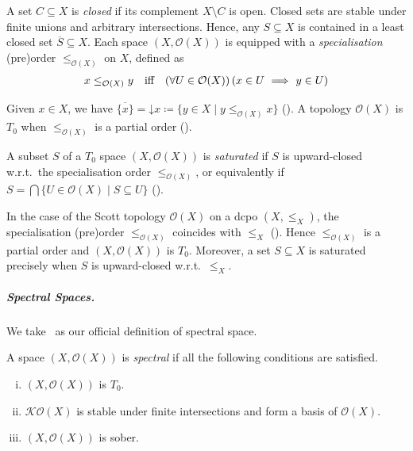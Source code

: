 \documentclass[%
  a4paper,
  UKenglish,
  cleveref,
  autoref,
  thm-restate,
  numberwithinsect,
]{lipics-v2021}
\newcommand\sle\subseteq
\newcommand\longimp\Longrightarrow
\newcommand\deq\coloneqq
\newcommand\down{\mathord{\downarrow}}
\newcommand\clos[1]{\overline{#1}}	%
\newcommand\SP{S}			%
\newcommand\Open{\mathcal{O}}		%
\newcommand\K{\mathcal{K}}		%
\begin{document}
A set $C \sle X$ is \emph{closed} if its complement $X \setminus C$ is open.
Closed sets are stable under finite unions and arbitrary
intersections.
Hence, any $\SP \sle X$ is contained in a least closed
set $\clos \SP  \sle X$. %
%
Each space $(X,\Open(X))$ is equipped with a \emph{specialisation} (pre)order
$\leq_{\Open(X)}$ on $X$, defined as
\[
\begin{array}{l l l}
  x \leq_{\Open(X)} y
& \text{iff}
& (\forall U \in \Open(X))
  \left(
  x \in U
  ~\longimp~
  y \in U
  \right)
\end{array}
\]

\noindent
Given $x \in X$, we have
$\clos{\{x\}} = \down x \deq \{ y \in X \mid y \leq_{\Open(X)} x\}$
(\cite[Lemma 4.2.7]{goubault13book}).
A topology $\Open(X)$ %
is \emph{$T_0$} when $\leq_{\Open(X)}$ is a partial order
(\cite[Proposition 4.2.3]{goubault13book}).


A subset $\SP$ of a $T_0$ space $(X,\Open(X))$ is \emph{saturated}
if $\SP$ is upward-closed w.r.t.\ the specialisation order $\leq_{\Open(X)}$,
or equivalently if
$\SP = \bigcap \{U \in \Open(X) \mid \SP \sle U \}$
(\cite[Proposition~4.2.9]{goubault13book}).


In the case of the Scott topology $\Open(X)$ on a dcpo $(X,\leq_X)$,
the specialisation (pre)order $\leq_{\Open(X)}$ 
coincides with $\leq_X$ (\cite[Lemma 1.2.3]{ac98book}).
Hence $\leq_{\Open(X)}$ is a partial order and $(X,\Open(X))$ is $T_0$.
Moreover, a set $\SP \sle X$ is saturated precisely when $\SP$
is upward-closed w.r.t.\ $\leq_X$.




\subparagraph*{Spectral Spaces.}

We take~\cite[Definition 1.1.5]{dst19book} as our official
definition of spectral space.

\begin{definition}
\label{def:proof:spectral}
A space $(X,\Open(X))$ is \emph{spectral} if all the following conditions
are satisfied.
\begin{enumerate}[(i)]
\item
\label{item:proof:spectral:T0}
$(X,\Open(X))$ is $T_0$.

\item
\label{item:proof:spectral:KO}
$\K\Open(X)$ is stable under finite intersections
and form a basis of $\Open(X)$.

\item
\label{item:proof:spectral:sober}
$(X,\Open(X))$ is sober.
\end{enumerate}
\end{definition}
\end{document}
